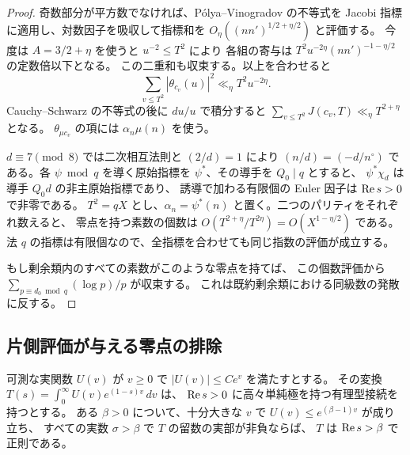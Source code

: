 \begin{proof}
奇数部分が平方数でなければ、Pólya--Vinogradov の不等式を
Jacobi 指標に適用し、対数因子を吸収して指標和を
\(O_\eta((nn')^{1/2+\eta/2})\) と評価する。
今度は \(A=3/2+\eta\) を使うと \(u^{-2}\le T^2\) により
各組の寄与は \(T^2u^{-2\eta}(nn')^{-1-\eta/2}\) の定数倍以下となる。
この二重和も収束する。以上を合わせると
\[
 \sum_{v\le T^2}|\theta_{c_v}(u)|^2\ll_\eta T^2u^{-2\eta}.
\]
Cauchy--Schwarz の不等式の後に \(du/u\) で積分すると
\(\sum_{v\le T^2}J(c_v,T)\ll_\eta T^{2+\eta}\) となる。
\(\theta_{\mu c_v}\) の項には \(\alpha_n\mu(n)\) を使う。

\(d\equiv7\pmod8\) では二次相互法則と \((2/d)=1\) により
\((n/d)=(-d/n^\circ)\) である。各 \(\psi\bmod q\) を導く原始指標を
\(\psi^\ast\)、その導手を \(Q_0\mid q\) とすると、
\(\psi^\ast\chi_d\) は導手 \(Q_0 d\) の非主原始指標であり、
誘導で加わる有限個の Euler 因子は \(\operatorname{Re} s>0\) で非零である。
\(T^2=qX\) とし、\(\alpha_n=\psi^\ast(n)\) と置く。二つのパリティをそれぞれ数えると、
零点を持つ素数の個数は \(O(T^{2+\eta}/T^{2\eta})=O(X^{1-\eta/2})\)
である。法 \(q\) の指標は有限個なので、全指標を合わせても同じ指数の評価が成立する。

もし剰余類内のすべての素数がこのような零点を持てば、
この個数評価から \(\sum_{p\equiv d_0\bmod q}(\log p)/p\) が収束する。
これは既約剰余類における同級数の発散に反する。
\end{proof}

\subsection{片側評価が与える零点の排除}

\begin{lemma}\label{lem:landau}
可測な実関数 \(U(v)\) が \(v\ge0\) で \(|U(v)|\le C e^v\) を満たすとする。
その変換 \(T(s)=\int_0^\infty U(v)e^{(1-s)v}\,dv\) は、
\(\operatorname{Re} s>0\) に高々単純極を持つ有理型接続を持つとする。
ある \(\beta>0\) について、十分大きな \(v\) で
\(U(v)\le e^{(\beta-1)v}\) が成り立ち、
すべての実数 \(\sigma>\beta\) で \(T\) の留数の実部が非負ならば、
\(T\) は \(\operatorname{Re} s>\beta\) で正則である。
\end{lemma}

